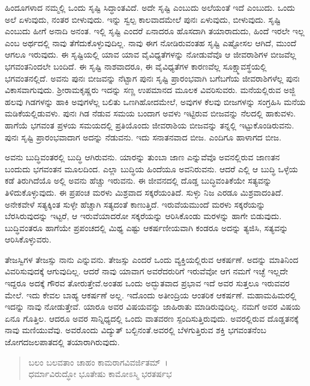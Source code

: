 ಹಿಂದೂಗಳಾದ ನಮ್ಮಲ್ಲಿ ಒಂದು ಸೃಷ್ಟಿ ಸಿದ್ಧಾಂತವಿದೆ. ಅದೇ ಸೃಷ್ಟಿ ಎಂಬುದು ಅಲೆಯಂತೆ ಇದೆ ಎಂಬುದು. ಒಂದು ಅಲೆ ಏಳುವುದು, ನಂತರ ಬೀಳುವುದು. ಇನ್ನು ಸ್ವಲ್ಪ ಕಾಲವಾದಮೇಲೆ ಪುನಃ ಏಳುವುದು, ಬೀಳುವುದು. ಸೃಷ್ಟಿ ಎಂಬುದು ಹೀಗೆ ಅನಾದಿ ಅನಂತ. ಇಲ್ಲಿ ಸೃಷ್ಟಿ ಎಂದರೆ ಏನಾದರೂ ಹೊಸದಾಗಿ ತಯಾರಾದುದು, ಹಿಂದೆ ಇರಲೇ ಇಲ್ಲ ಎಂಬ ಅರ್ಥದಲ್ಲಿ ನಾವು ತೆಗೆದುಕೊಳ್ಳುವುದಿಲ್ಲ. ನಾವು ಈಗ ನೋಡಿರುವಂತಹ ಸೃಷ್ಟಿ ಎಷ್ಟೋಸಲ ಆಗಿದೆ, ಮುಂದೆ ಆಗಲೂ ಇರುವುದು. ಈ ಸೃಷ್ಟಿಯಲ್ಲಿ ಯಾವ ಯಾವ ವೈವಿಧ್ಯತೆಗಳನ್ನು ನೋಡುವೆವೊ ಆ ಜೀವರಾಶಿಗಳ ಬೀಜವೆಲ್ಲ ಭಗವಂತನಿಂದಲೇ ಬಂದಿದೆ. ಈ ಸೃಷ್ಟಿ ನಾಶವಾದರೂ, ಈ ವೈವಿಧ್ಯತೆಗಳ ಕಾರಣವೆಲ್ಲ ಸೂಕ್ಷ್ಮಾವಸ್ಥೆಯಲ್ಲಿ ಭಗವಂತನಲ್ಲಿದೆ. ಅವನು ಪುನಃ ಬೀಜವನ್ನು ನೆಟ್ಟಾಗ ಪುನಃ ಸೃಷ್ಟಿ ಪ್ರಾರಂಭವಾಗಿ ಬಗೆಬಗೆಯ ಜೀವರಾಶಿಗಳೆಲ್ಲ ಪುನಃ ವಿಕಾಸವಾಗುವುದು. ಶ‍್ರೀರಾಮಕೃಷ್ಣರು ಇದನ್ನು ಸಣ್ಣ ಉಪಮಾನದ ಮೂಲಕ ವಿವರಿಸುವರು. ಮನೆಯಲ್ಲಿರುವ ಅಜ್ಜಿ ಹಲವು ಗಿಡಗಳನ್ನು ಹಾಕಿ ಅವುಗಳೆಲ್ಲ ಬಲಿತು ಒಣಗಿಹೋದಮೇಲೆ, ಅವುಗಳ ಕೆಲವು ಬೀಜಗಳನ್ನು ಸಂಗ್ರಹಿಸಿ ಮನೆಯ ಮಡಿಕೆಯಲ್ಲಿಡುವಳು. ಪುನಃ ಗಿಡ ನೆಡುವ ಸಮಯ ಬಂದಾಗ ಅವಳು ಇಟ್ಟಿರುವ ಬೀಜವನ್ನು ನೆಲದಲ್ಲಿ ಹಾಕುವಳು. ಹಾಗೆಯೆ ಭಗವಂತ ಪ್ರಳಯ ಸಮಯದಲ್ಲಿ ಪ್ರತಿಯೊಂದು ಜೀವರಾಶಿಯ ಬೀಜವನ್ನು ತನ್ನಲ್ಲಿ ಇಟ್ಟುಕೊಂಡಿರುವನು. ಪುನಃ ಸೃಷ್ಟಿ ಪ್ರಾರಂಭವಾದಾಗ ಅದನ್ನು ನೆಡುವನು. ಇದು ಸನಾತನವಾದ ಬೀಜ. ಎಂದಿಗೂ ಹಾಳಾಗದ ಬೀಜ.

ಅವನು ಬುದ್ಧಿವಂತರಲ್ಲಿ ಬುದ್ಧಿ ಆಗಿರುವನು. ಯಾರನ್ನು ತುಂಬಾ ಜಾಣ ಎನ್ನುವೆವೊ ಅವನಲ್ಲಿರುವ ಜಾಣತನ ಬಂದುದು ಭಗವಂತನ ಮೂಲದಿಂದ. ಎಲ್ಲಾ ಬುದ್ಧಿಯ ಹಿಂದೆಯೂ ಅವನಿರುವನು. ಆದರೆ ಎಲ್ಲಿ ಆ ಬುದ್ಧಿ ಒಳ್ಳೆಯ ಕಡೆ ತಿರುಗಿದೆಯೊ ಅಲ್ಲಿ ಅವನು ಹೆಚ್ಚು ಇರುವನು. ಈ ಜೀವನದಲ್ಲಿ ದೊಡ್ಡ ಬುದ್ಧಿವಂತಿಕೆಯೇ ಸತ್ಯವನ್ನು ತಿಳಿದುಕೊಳ್ಳುವುದು. ಈ ಪ್ರಪಂಚ ಮರಳು ಮಿಶ್ರವಾದ ಸಕ್ಕರೆಯಂತಿದೆ. ಸುಳ್ಳು ನಿಜ ಎರಡೂ ಮಿಶ್ರವಾದಂತಿದೆ. ಅನೇಕವೇಳೆ ಸತ್ಯಕ್ಕಿಂತ ಸುಳ್ಳೇ ಹೆಚ್ಚಾಗಿ ಸತ್ಯದಂತೆ ಕಾಣುತ್ತಿದೆ. ಇರುವೆಯಮುಂದೆ ಮರಳು ಸಕ್ಕರೆಯನ್ನು ಬೆರಸಿರುವುದನ್ನು ಇಟ್ಟರೆ, ಆ ಇರುವೆಯಾದರೋ ಸಕ್ಕರೆಯನ್ನು ಆರಿಸಿಕೊಂಡು ಮರಳನ್ನು ಹಾಗೇ ಬಿಡುವುದು. ಬುದ್ಧಿವಂತರೂ ಹಾಗೆಯೇ ಪ್ರಪಂಚದಲ್ಲಿ ಮಿಥ್ಯ ಎಷ್ಟು ಆಕರ್ಷಣೀಯವಾಗಿ ಕಂಡರೂ ಅದನ್ನು ತ್ಯಜಿಸಿ, ಸತ್ಯವನ್ನು ಆರಿಸಿಕೊಳ್ಳುವರು.

ತೇಜಸ್ವಿಗಳ ತೇಜಸ್ಸು ನಾನು ಎನ್ನುವನು. ತೇಜಸ್ಸು ಎಂದರೆ ಒಂದು ವ್ಯಕ್ತಿಯಲ್ಲಿರುವ ಆಕರ್ಷಣೆ. ಅದನ್ನು ಮಾತಿನಿಂದ ವಿವರಿಸುವುದಕ್ಕೆ ಆಗುವುದಿಲ್ಲ. ಆದರೆ ನಾವು ಯಾವಾಗ ಅವರೆದರುರಿಗೆ ಇರುವೆವೋ ಆಗ ನಮಗೆ ಇಚ್ಛೆ ಇಲ್ಲದೇ ಇದ್ದರೂ ಅದಕ್ಕೆ ಗೌರವ ತೋರುತ್ತೇವೆ.ಅಂತಹ ಒಂದು ಅದ್ಭುತವಾದ ಪ್ರಭಾವ ಇದೆ ಅವರ ಸುತ್ತಲೂ ಇರುವವರ ಮೇಲೆ. ಇದು ಕೇವಲ ಬಾಹ್ಯ ಆಕರ್ಷಣೆ ಅಲ್ಲ. ಇದೊಂದು ಅತೀಂದ್ರಿಯ ಆಂತರಿಕ ಆಕರ್ಷಣೆ. ಮಹಾಮಹಿಮರಲ್ಲಿ ಇದನ್ನು ನಾವು ನೋಡುತ್ತೇವೆ. ಯಾರೂ ಅವರ ವಿಷಯವನ್ನು ಜಾಹಿರಾತು ಮಾಡಿರುವುದಿಲ್ಲ. ನಮಗೆ ಅವರ ವಿಷಯ ಏನೂ ಗೊತ್ತಿಲ. ಆದರೂ ಅವರ ಸಾನ್ನಿಧ್ಯದಲ್ಲಿ ಒಂದು ವಾತವರಣ ಸ್ಪಂದಿಸುತ್ತಿರುವುದು. ಅವರಲ್ಲಿರುವ ದೊಡ್ಡತನಕ್ಕೆ ನಾವು ಮಣಿಯುವೆವು. ಅವರೊಂದು ವಿದ್ಯುತ್ ಬಲ್ಬಿನಂತೆ.ಅವರಲ್ಲಿ ಬೆಳಗುತ್ತಿರುವ ಶಕ್ತಿ ಭಗವಂತನೆಂಬ ಜೋಗದಜಲಪಾತದಲ್ಲಿ ತಯಾರಾಗಿರುವುದು.

\begin{verse}
ಬಲಂ ಬಲವತಾಂ ಚಾಹಂ ಕಾಮರಾಗವಿವರ್ಜಿತಮ್~।\\ಧರ್ಮಾವಿರುದ್ಧೋ ಭೂತೇಷು ಕಾಮೋಽಸ್ಮಿ ಭರತರ್ಷಭ 
\end{verse}

